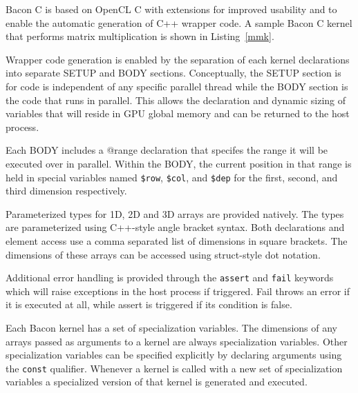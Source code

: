 \documentclass{llncs}
\begin{document}
Bacon C is based on OpenCL C with extensions for improved usability
and to enable the automatic generation of C++ wrapper code. A sample
Bacon C kernel that performs matrix multiplication is shown in
Listing~\ref{mmk}.

Wrapper code generation is enabled by the separation of each kernel
declarations into separate SETUP and BODY sections. Conceptually, the
SETUP section is for code is independent of any specific parallel
thread while the BODY section is the code that runs in parallel. This
allows the declaration and dynamic sizing of variables that will
reside in GPU global memory and can be returned to the host process.

Each BODY includes a @range declaration that specifes the range it
will be executed over in parallel. Within the BODY, the current
position in that range is held in special variables named {\tt\$row},
{\tt\$col}, and {\tt\$dep} for the first, second, and third dimension
respectively.

Parameterized types for 1D, 2D and 3D arrays are provided
natively. The types are parameterized using C++-style angle bracket
syntax. Both declarations and element access use a comma separated
list of dimensions in square brackets. The dimensions of these arrays
can be accessed using struct-style dot notation.

Additional error handling is provided through the {\tt assert} and
{\tt fail} keywords which will raise exceptions in the host process if
triggered. Fail throws an error if it is executed at all, while assert
is triggered if its condition is false.

Each Bacon kernel has a set of specialization variables. The
dimensions of any arrays passed as arguments to a kernel are always
specialization variables. Other specialization variables can be
specified explicitly by declaring arguments using the {\tt const}
qualifier. Whenever a kernel is called with a new set of
specialization variables a specialized version of that kernel is
generated and executed.
\end{document}
